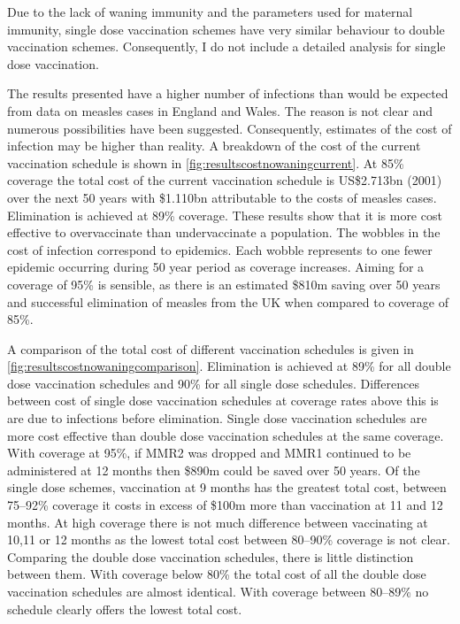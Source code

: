 \documentclass[a4paper,11pt] {scrartcl}
\begin{document}
Due to the lack of waning immunity and the parameters used for maternal immunity, single dose vaccination schemes have very similar behaviour to double vaccination schemes. Consequently, I do not include a detailed analysis for single dose vaccination.

The results presented have a higher number of infections than would be expected from data on measles cases in England and Wales\cite{hpameaslesnotificationsanddeaths}. The reason is not clear and numerous possibilities have been suggested. Consequently, estimates of the cost of infection may be higher than reality. A breakdown of the cost of the current vaccination schedule is shown in \autoref{fig:resultscostnowaningcurrent}. At 85\% coverage the total cost of the current vaccination schedule is US\$2.713bn (2001) over the next 50 years with \$1.110bn attributable to the costs of measles cases. Elimination is achieved at 89\% coverage. These results show that it is more cost effective to overvaccinate than undervaccinate a population. The wobbles in the cost of infection correspond to epidemics. Each wobble represents to one fewer epidemic occurring during 50 year period as coverage increases. Aiming for a coverage of 95\% is sensible, as there is an estimated \$810m saving over 50 years  and successful elimination of measles from the UK when compared to coverage of 85\%.

A comparison of the total cost of different vaccination schedules is given in \autoref{fig:resultscostnowaningcomparison}. Elimination is achieved at 89\% for all double dose vaccination schedules and 90\% for all single dose schedules. Differences between cost of single dose vaccination schedules at coverage rates above this is are due to infections before elimination. Single dose vaccination schedules are more cost effective than double dose vaccination schedules at the same coverage. With coverage at 95\%, if MMR2 was dropped and MMR1 continued to be administered at 12 months then \$890m could be saved over 50 years. Of the single dose schemes, vaccination at 9 months has the greatest total cost, between 75--92\% coverage it costs in excess of \$100m more than vaccination at 11 and 12 months. At high coverage there is not much difference between vaccinating at 10,11 or 12 months as the lowest total cost between 80--90\% coverage is not clear. Comparing the double dose vaccination schedules, there is little distinction between them. With coverage below 80\% the total cost of all the double dose vaccination schedules are almost identical. With coverage between 80--89\% no schedule clearly offers the lowest total cost.
\end{document}
